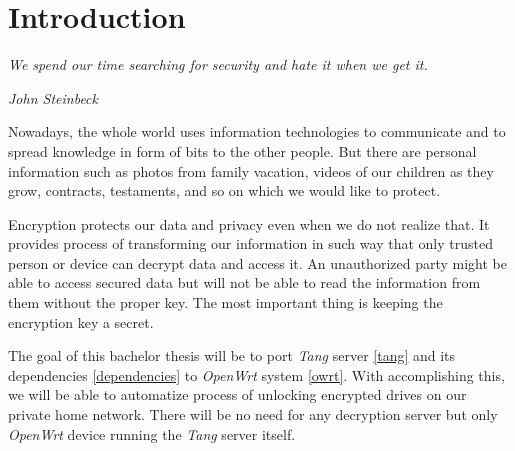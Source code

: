 \documentclass[../xdudla00-porting-Tang-to-Open-WRT.tex]{subfiles}
\begin{document}
\chapter{Introduction}\label{introduction}
\epigraph{\it We spend our time searching for security and hate it when we get it.}{\textit{John Steinbeck}\cite{quote}}

Nowadays, the whole world uses information technologies to communicate and to spread knowledge in form of bits to the other people.
But there are personal information such as photos from family vacation, videos of our children as they grow, contracts, testaments, and so on which we would like to protect.

Encryption protects our data and privacy even when we do not realize that.
It provides process of transforming our information in such way that only trusted person or device can decrypt data and access it.
An unauthorized party might be able to access secured data but will not be able to read the information from them without the proper key.
The most important thing is keeping the encryption key a secret.

The goal of this bachelor thesis will be to port {\it Tang} server \ref{tang} and its dependencies \ref{dependencies} to {\it OpenWrt} system \ref{owrt}.
With accomplishing this, we will be able to automatize process of unlocking encrypted drives on our private home network.
There will be no need for any decryption server but only {\it OpenWrt} device running the {\it Tang} server itself.
\end{document}
